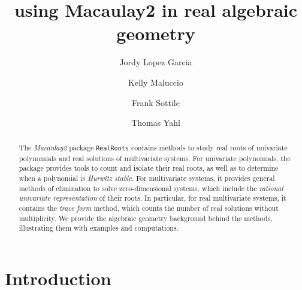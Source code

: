 \documentclass[12pt]{amsart}
\title{using Macaulay2 in real algebraic geometry}
\author[J.~Lopez Garcia]{Jordy Lopez Garcia}
\author[K.~Maluccio]{Kelly Maluccio}
\author[F.~Sottile]{Frank Sottile}
\author[T.~Yahl]{Thomas Yahl}
\theoremstyle{definition}
\begin{document}
%
%

\begin{abstract}

The \textit{Macaulay2} package \texttt{RealRoots} contains methods to study real roots of univariate polynomials and real solutions of multivariate systems. For univariate polynomials, the package provides tools to count and isolate their real roots, as well as to determine when a polynomial is \textit{Hurwitz stable}. For multivariate systems, it provides general methods of elimination to solve zero-dimensional systems, which include the \textit{rational univariate representation} of their roots. In particular, for real multivariate systems, it contains the \textit{trace form} method, which counts the number of real solutions without multiplicity. We provide the algebraic geometry background behind the methods, illustrating them with examples and computations.

\end{abstract}

\maketitle


\section*{Introduction}

\end{document}
